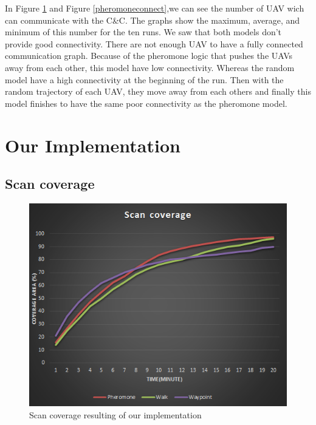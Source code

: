 In Figure \ref{randomconnect} and Figure \ref{pheromoneconnect},we can see the number of UAV wich can communicate with the C\&C.  The  graphs  show the maximum, average, and minimum of this number for the ten runs. We saw that both models don't provide good connectivity. There are not enough UAV to have a fully connected communication graph. Because of the pheromone logic that pushes the UAVs away from each other, this model have low connectivity. Whereas the random model have a high connectivity at the beginning of the run. Then with the random trajectory of each UAV, they move away from each others and finally this model finishes to have the same poor connectivity as the pheromone model.

\section{Our Implementation}

\subsection{Scan coverage}


\begin{figure}[!h]
   \includegraphics{../images/ScanCoverageResult.png}
\caption{\label{randomconnect} Scan coverage resulting of our implementation}
\end{figure}


